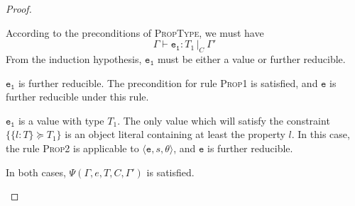 \documentclass[12pt,a4paper,twoside,openright]{report}
\theoremstyle{definition}
\theoremstyle{dotless}
\newcommand{\typed}[2]{\Gamma{}\vdash\mathtt{#1}: #2\,|_C\:\Gamma'}
\newcommand{\transition}[6]{\langle{}\mathtt{#1},#2,#3\rangle{}\rightarrow{}\langle{}\mathtt{#4},#5,#6\rangle}
\newcommand{\indHypTwo}{\Psi(\Gamma, e, T, C, \Gamma')}
\newcommand\qdot{\mathbin{\scalebox{1.5}{.}}\enspace}
\begin{document}
\begin{proof}
\begin{case}[PropType]
	According to the preconditions of \textsc{PropType}, we must have
	$$\typed{e_1}{T_1}$$
	From the induction hypothesis, $\mathtt{e_1}$ must be either a
	value or further reducible.
	\begin{subcase}
	  $\mathtt{e_1}$ is further reducible.
	  The precondition for rule \textsc{Prop1} is
	  satisfied, and $\mathtt{e}$ is further reducible under this rule.
  	\end{subcase}
  	\begin{subcase}
  	  $\mathtt{e_1}$ is a value with type $T_1$.
  	  The only value which will satisfy the constraint $\{\{l:T\}\succeq T_1\}$
	  is an object literal containing at least the property $l$. In this case, the rule
	  \textsc{Prop2} is applicable to $\langle \mathtt{e}, s, \theta\rangle$, and $\mathtt{e}$ is
	  further reducible.
  	\end{subcase}
	In both cases, $\indHypTwo$ is satisfied.

  \end{case}
%
%
%
%
%
%
%


\end{proof}
\end{document}
